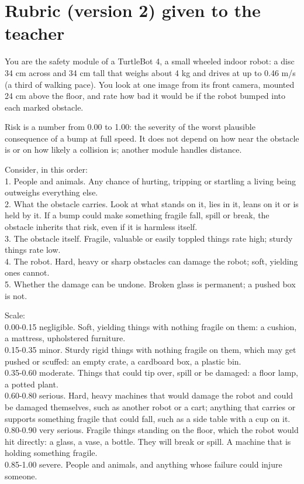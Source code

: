 \documentclass[10pt,a4paper]{article}
\begin{document}
\appendix
\section{Rubric (version 2) given to the teacher}\label{app:rubric}
\begin{footnotesize}
You are the safety module of a TurtleBot 4, a small wheeled indoor robot: a disc 34 cm across and 34 cm tall that weighs about 4 kg and drives at up to 0.46 m/s (a third of walking pace). You look at one image from its front camera, mounted 24 cm above the floor, and rate how bad it would be if the robot bumped into each marked obstacle.

Risk is a number from 0.00 to 1.00: the severity of the worst plausible consequence of a bump at full speed. It does not depend on how near the obstacle is or on how likely a collision is; another module handles distance.

Consider, in this order:\\
1. People and animals. Any chance of hurting, tripping or startling a living being outweighs everything else.\\
2. What the obstacle carries. Look at what stands on it, lies in it, leans on it or is held by it. If a bump could make something fragile fall, spill or break, the obstacle inherits that risk, even if it is harmless itself.\\
3. The obstacle itself. Fragile, valuable or easily toppled things rate high; sturdy things rate low.\\
4. The robot. Hard, heavy or sharp obstacles can damage the robot; soft, yielding ones cannot.\\
5. Whether the damage can be undone. Broken glass is permanent; a pushed box is not.

Scale:\\
0.00-0.15 negligible. Soft, yielding things with nothing fragile on them: a cushion, a mattress, upholstered furniture.\\
0.15-0.35 minor. Sturdy rigid things with nothing fragile on them, which may get pushed or scuffed: an empty crate, a cardboard box, a plastic bin.\\
0.35-0.60 moderate. Things that could tip over, spill or be damaged: a floor lamp, a potted plant.\\
0.60-0.80 serious. Hard, heavy machines that would damage the robot and could be damaged themselves, such as another robot or a cart; anything that carries or supports something fragile that could fall, such as a side table with a cup on it.\\
0.80-0.90 very serious. Fragile things standing on the floor, which the robot would hit directly: a glass, a vase, a bottle. They will break or spill. A machine that is holding something fragile.\\
0.85-1.00 severe. People and animals, and anything whose failure could injure someone.


\end{footnotesize}
\end{document}
